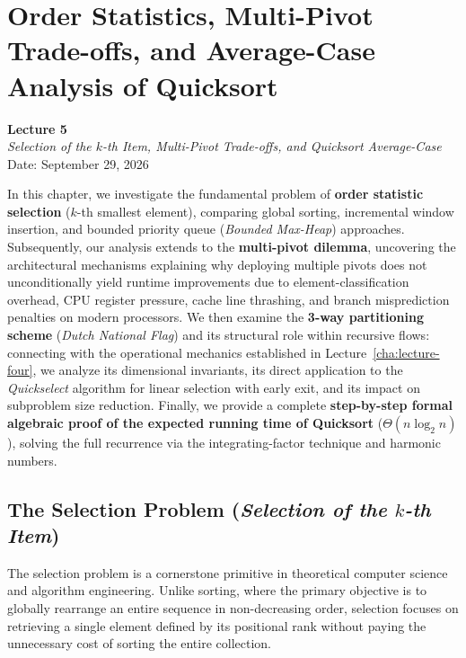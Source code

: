 \chapter{Order Statistics, Multi-Pivot Trade-offs, and Average-Case Analysis of Quicksort}
\label{cha:lecture-five}

\begin{center}
  \textbf{Lecture 5}\\
  \emph{Selection of the $k$-th Item, Multi-Pivot Trade-offs, and Quicksort Average-Case}\\[0.5em]
  Date: September 29, 2026
\end{center}

In this chapter, we investigate the fundamental problem of \textbf{order statistic selection} ($k$-th smallest element), comparing global sorting, incremental window insertion, and bounded priority queue (\textit{Bounded Max-Heap}) approaches. Subsequently, our analysis extends to the \textbf{multi-pivot dilemma}, uncovering the architectural mechanisms explaining why deploying multiple pivots does not unconditionally yield runtime improvements due to element-classification overhead, CPU register pressure, cache line thrashing, and branch misprediction penalties on modern processors. We then examine the \textbf{3-way partitioning scheme} (\textit{Dutch National Flag}) and its structural role within recursive flows: connecting with the operational mechanics established in Lecture~\ref{cha:lecture-four}, we analyze its dimensional invariants, its direct application to the \textit{Quickselect} algorithm for linear selection with early exit, and its impact on subproblem size reduction. Finally, we provide a complete \textbf{step-by-step formal algebraic proof of the expected running time of Quicksort} ($\Theta(n \log_2 n)$), solving the full recurrence via the integrating-factor technique and harmonic numbers.

\FloatBarrier
\section{The Selection Problem (\textit{Selection of the \texorpdfstring{$k$}{k}-th Item})}
\label{sec:selection-problem}

The selection problem is a cornerstone primitive in theoretical computer science and algorithm engineering. Unlike sorting, where the primary objective is to globally rearrange an entire sequence in non-decreasing order, selection focuses on retrieving a single element defined by its positional rank without paying the unnecessary cost of sorting the entire collection.

